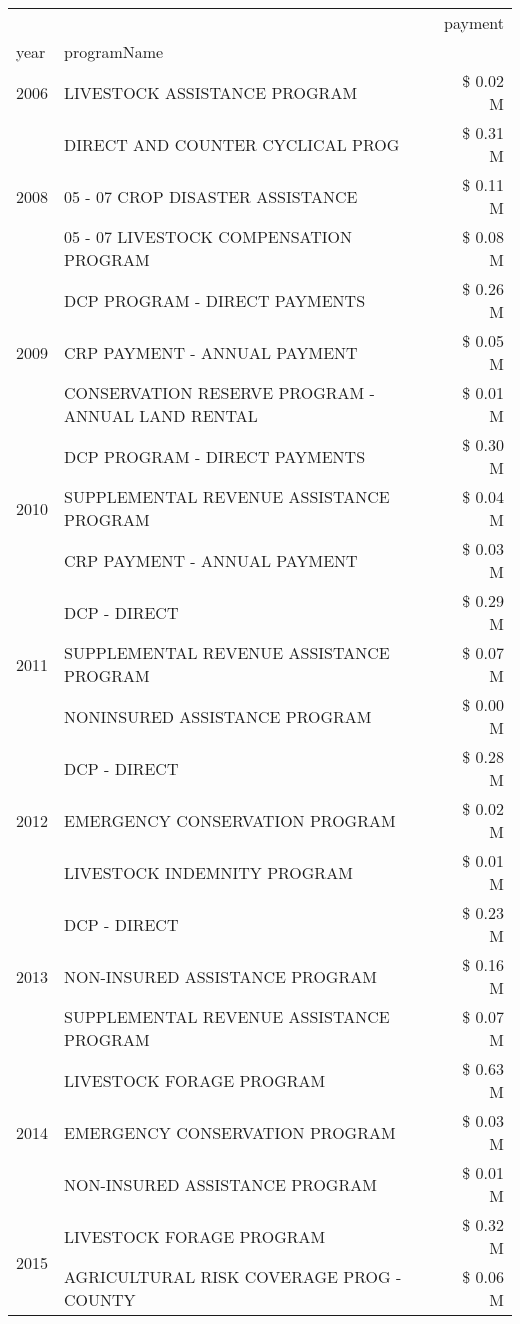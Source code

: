 \begin{tabular}{llr}
\toprule
 &  & payment \\
year & programName &  \\
\midrule
2006 & LIVESTOCK ASSISTANCE PROGRAM & \$ 0.02 M \\
\cline{1-3}
\multirow[t]{3}{*}{2008} & DIRECT AND COUNTER CYCLICAL PROG & \$ 0.31 M \\
 & 05 - 07 CROP DISASTER ASSISTANCE & \$ 0.11 M \\
 & 05 - 07 LIVESTOCK COMPENSATION PROGRAM & \$ 0.08 M \\
\cline{1-3}
\multirow[t]{3}{*}{2009} & DCP PROGRAM - DIRECT PAYMENTS & \$ 0.26 M \\
 & CRP PAYMENT - ANNUAL PAYMENT & \$ 0.05 M \\
 & CONSERVATION RESERVE PROGRAM - ANNUAL LAND RENTAL & \$ 0.01 M \\
\cline{1-3}
\multirow[t]{3}{*}{2010} & DCP PROGRAM - DIRECT PAYMENTS & \$ 0.30 M \\
 & SUPPLEMENTAL REVENUE ASSISTANCE PROGRAM & \$ 0.04 M \\
 & CRP PAYMENT - ANNUAL PAYMENT & \$ 0.03 M \\
\cline{1-3}
\multirow[t]{3}{*}{2011} & DCP - DIRECT & \$ 0.29 M \\
 & SUPPLEMENTAL REVENUE ASSISTANCE PROGRAM & \$ 0.07 M \\
 & NONINSURED ASSISTANCE PROGRAM & \$ 0.00 M \\
\cline{1-3}
\multirow[t]{3}{*}{2012} & DCP - DIRECT & \$ 0.28 M \\
 & EMERGENCY CONSERVATION PROGRAM & \$ 0.02 M \\
 & LIVESTOCK INDEMNITY PROGRAM & \$ 0.01 M \\
\cline{1-3}
\multirow[t]{3}{*}{2013} & DCP - DIRECT & \$ 0.23 M \\
 & NON-INSURED ASSISTANCE PROGRAM & \$ 0.16 M \\
 & SUPPLEMENTAL REVENUE ASSISTANCE PROGRAM & \$ 0.07 M \\
\cline{1-3}
\multirow[t]{3}{*}{2014} & LIVESTOCK FORAGE PROGRAM & \$ 0.63 M \\
 & EMERGENCY CONSERVATION PROGRAM & \$ 0.03 M \\
 & NON-INSURED ASSISTANCE PROGRAM & \$ 0.01 M \\
\cline{1-3}
\multirow[t]{3}{*}{2015} & LIVESTOCK FORAGE PROGRAM & \$ 0.32 M \\
 & AGRICULTURAL RISK COVERAGE PROG - COUNTY & \$ 0.06 M \\

\end{tabular}
